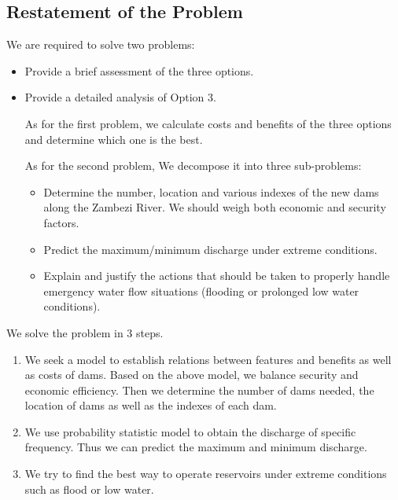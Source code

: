 \documentclass[12pt]{article}%
\begin{document}
\subsection{Restatement of the Problem}
We are required to solve two problems:
\begin{itemize}
    \item Provide a brief assessment of the three options.
    \item Provide a detailed analysis of Option 3.
\par\noindent
As for the first problem, we calculate costs and benefits of the three options and determine which one is the best.
\par\noindent
As for the second problem, We decompose it into three sub-problems:
	\begin{itemize}
	\item Determine the number, location and various indexes of the new dams along the Zambezi River. We should weigh both economic and security factors.
	\item Predict the maximum/minimum discharge under extreme conditions.
	\item Explain and justify the actions that should be taken to properly handle emergency water flow situations (flooding or prolonged low water conditions).
	\end{itemize}
\end{itemize}
We solve the problem in 3 steps.
\begin{enumerate}[Step1.]
	\item We seek a model to establish relations between features and benefits as well as costs of dams. Based on the above model, we balance security and economic efficiency. Then we determine the number of dams needed, the location of dams as well as the indexes of each dam.
	\item We use probability statistic model to obtain the discharge of specific frequency. Thus we can predict the maximum and minimum discharge.
	\item We try to find the best way to operate reservoirs under extreme conditions such as flood or low water.
\end{enumerate}
\newpage
\end{document}
